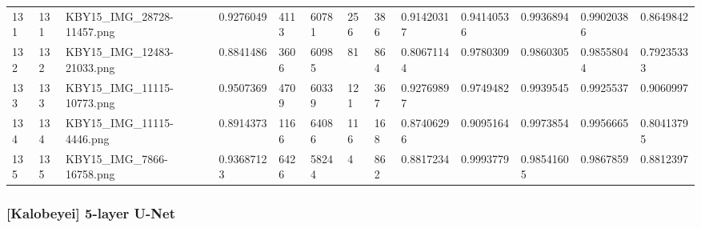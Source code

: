 \documentclass[11pt, a4paper, twoside]{report}
\begin{document}
\begin{longtable}[c]{@{}lllllllllllll@{}}
131 & 131 & KBY15\_IMG\_28728-11457.png & 0.9276049 & 4113 & 60781 & 256 & 386 & 0.91420317 & 0.94140536 & 0.9936894 & 0.99020386 & 0.8649842 \\
132 & 132 & KBY15\_IMG\_12483-21033.png & 0.8841486 & 3606 & 60985 & 81 & 864 & 0.80671144 & 0.9780309 & 0.9860305 & 0.98558044 & 0.79235333 \\
133 & 133 & KBY15\_IMG\_11115-10773.png & 0.9507369 & 4709 & 60339 & 121 & 367 & 0.92769897 & 0.9749482 & 0.9939545 & 0.9925537 & 0.9060997 \\
134 & 134 & KBY15\_IMG\_11115-4446.png & 0.8914373 & 1166 & 64086 & 116 & 168 & 0.87406296 & 0.9095164 & 0.9973854 & 0.9956665 & 0.80413795 \\
135 & 135 & KBY15\_IMG\_7866-16758.png & 0.93687123 & 6426 & 58244 & 4 & 862 & 0.8817234 & 0.9993779 & 0.98541605 & 0.9867859 & 0.8812397 \\* \bottomrule
\end{longtable}

\newpage

\subsubsection{[Kalobeyei] 5-layer U-Net}
\end{document}
